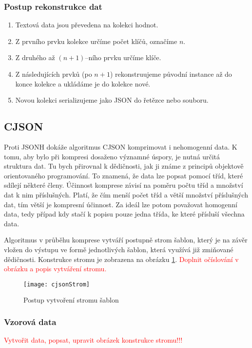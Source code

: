 \subsubsection{Postup rekonstrukce dat}
\begin{enumerate}
\item Textová data jsou převedena na kolekci hodnot.
\item Z prvního prvku kolekce určíme počet klíčů, označíme $n$.
\item Z druhého až $(n+1)$--ního prvku určíme klíče.
\item Z následujících prvků (po $n+1$) rekonstruujeme původní instance až do konce kolekce a ukládáme je do kolekce nové.
\item Novou kolekci serializujeme jako JSON do řetězce nebo souboru.
\end{enumerate}

\subsection{CJSON}
Proti JSONH dokáže algoritmus CJSON komprimovat i nehomogenní data. K tomu, aby bylo při kompresi dosaženo významné úspory, je nutná určitá struktura dat. Tu bych přirovnal k dědičnosti, jak ji známe z principů objektově orientovaného programování. To znamená, že data lze popsat pomocí tříd, které sdílejí některé členy. Účinnost komprese závisí na poměru počtu tříd a množství dat k nim příslušných. Platí, že čím menší počet tříd a větší množství příslušných dat, tím větší je kompresní účinnost. Za ideál lze potom považovat homogenní data, tedy případ kdy stačí k popisu pouze jedna třída, ke které přísluší všechna data.

Algoritmus v průběhu komprese vytváří postupně strom šablon, který je na závěr vložen do výstupu ve formě jednotlivých šablon, která využívá již zmiňované dědičnosti. Konstrukce stromu je zobrazena na obrázku \ref{cjsonKonstrukceStromu}. \textcolor{red}{Doplnit očíslování v obrázku a popis vytváření stromu.}

\begin{figure}[!htb]
\centering
\texttt{[image: cjsonStrom]}
\caption{Postup vytvoření stromu šablon}
\label{cjsonKonstrukceStromu}
\end{figure}

\subsubsection{Vzorová data}
\textcolor{red}{Vytvořit data, popsat, upravit obrázek konstrukce stromu!!!}

